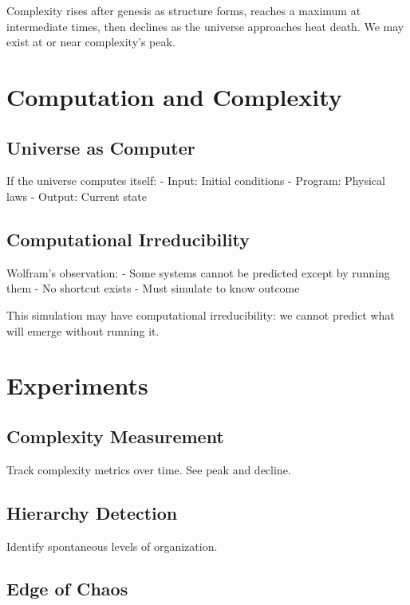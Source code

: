 \documentclass[
  11pt,
  letterpaper,
  twoside,
  openright]{book}
\begin{document}
Complexity rises after genesis as structure forms, reaches a maximum at
intermediate times, then declines as the universe approaches heat death.
We may exist at or near complexity's peak.

\section{Computation and Complexity}\label{computation-and-complexity}

\subsection{Universe as Computer}\label{universe-as-computer}

If the universe computes itself: - Input: Initial conditions - Program:
Physical laws - Output: Current state

\subsection{Computational
Irreducibility}\label{computational-irreducibility}

Wolfram's observation: - Some systems cannot be predicted except by
running them - No shortcut exists - Must simulate to know outcome

This simulation may have computational irreducibility: we cannot predict
what will emerge without running it.

\section{Experiments}\label{experiments-39}

\subsection{Complexity Measurement}\label{complexity-measurement}

Track complexity metrics over time. See peak and decline.

\subsection{Hierarchy Detection}\label{hierarchy-detection}

Identify spontaneous levels of organization.

\subsection{Edge of Chaos}\label{edge-of-chaos}
\end{document}
